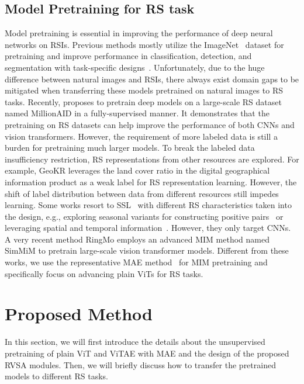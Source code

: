 \documentclass[10pt, journal,twoside]{IEEEtran}
\begin{document}
\subsection{Model Pretraining for RS task}
Model pretraining is essential in improving the performance of deep neural networks on RSIs. Previous methods mostly utilize the ImageNet~\cite{imagenet} dataset for pretraining and improve performance in classification, detection, and segmentation with task-specific designs~\cite{lse_2021_asr,roi_transformer,farseg}. Unfortunately, due to the huge difference between natural images and RSIs, there always exist domain gaps to be mitigated when transferring these models pretrained on natural images to RS tasks. Recently, \cite{wang_rsp_2022} proposes to pretrain deep models on a large-scale RS dataset named MillionAID in a fully-supervised manner. It demonstrates that the pretraining on RS datasets can help improve the performance of both CNNs and vision transformers. However, the requirement of more labeled data is still a burden for pretraining much larger models. To break the labeled data insufficiency restriction, RS representations from other resources are explored. For example, GeoKR \cite{geokr} leverages the land cover ratio in the digital geographical information product as a weak label for RS representation learning. However, the shift of label distribution between data from different resources still impedes learning. Some works resort to SSL~\cite{simclr, mocov2, regioncl, mae} with different RS characteristics taken into the design, e.g., exploring seasonal variants for constructing positive pairs~\cite{seco} or leveraging spatial and temporal information~\cite{geography_aware}. However, they only target CNNs. A very recent method RingMo \cite{ringmo} employs an advanced MIM method named SimMiM \cite{simmim} to pretrain large-scale vision transformer models. Different from these works, we use the representative MAE method~\cite{mae} for MIM pretraining and specifically focus on advancing plain ViTs for RS tasks.

 
\section{Proposed Method}
 
In this section, we will first introduce the details about the unsupervised pretraining of plain ViT and ViTAE with MAE and the design of the proposed RVSA modules. Then, we will briefly discuss how to transfer the pretrained models to different RS tasks.
\end{document}
